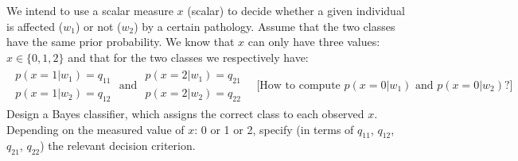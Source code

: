 \Exercise[number={13}]
We intend to use a scalar measure \(x\) (scalar) to decide whether a
given individual is affected (\(w_1\)) or not (\(w_2\)) by a certain
pathology. Assume that the two classes have the same prior probability.
We know that \(x\) can only have three values: \(x\in\{0,1,2\}\) and that
for the two classes we respectively have:
\begin{align*}
    \begin{matrix}
        p(x=1|w_1)=q_{11} \\ p(x=1|w_2)=q_{12}
    \end{matrix}
    \text{ and }
    \begin{matrix}
        p(x=2|w_1)=q_{21} \\ p(x=2|w_2)=q_{22}
    \end{matrix}
    \quad
    \bigl[
        \text{How to compute }
        p(x=0|w_1)
        \text{ and }
        p(x=0|w_2)
        \text{?}
    \bigr]
\end{align*}
Design a Bayes classifier, which assigns the correct class to each
observed \(x\). Depending on the measured value of \(x\): 0 or 1 or 2,
specify (in terms of \(q_{11}\), \(q_{12}\), \(q_{21}\), \(q_{22}\)) the
relevant decision criterion.


